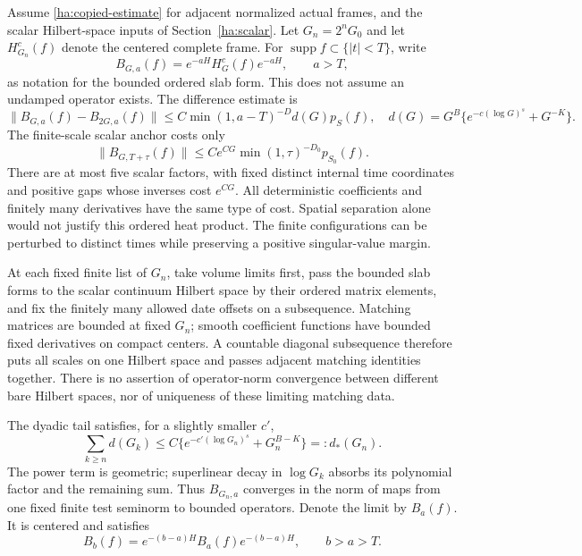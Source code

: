 Assume \eqref{ha:copied-estimate} for adjacent normalized actual frames,
and the scalar Hilbert-space inputs of Section~\ref{ha:scalar}.  Let
$G_n=2^nG_0$ and let $H_{G_n}^c(f)$ denote the centered complete frame.
For $\operatorname{supp}f\subset\{|t|<T\}$, write
\begin{equation}
 B_{G,a}(f)=e^{-aH}H_G^c(f)e^{-aH},\qquad a>T,
 \label{ha:finite-heat}
\end{equation}
as notation for the bounded ordered slab form.  This does not assume an
undamped operator exists.  The difference estimate is
\begin{equation}
 \|B_{G,a}(f)-B_{2G,a}(f)\|
 \leq C\min(1,a-T)^{-D}d(G)p_S(f),
 \quad d(G)=G^B\{e^{-c(\log G)^s}+G^{-K}\}.
 \label{ha:dyadic-difference}
\end{equation}
The finite-scale scalar anchor costs only
\begin{equation}
 \|B_{G,T+\tau}(f)\|\leq Ce^{CG}\min(1,\tau)^{-D_0}p_{S_0}(f).
 \label{ha:heat-anchor}
\end{equation}
There are at most five scalar factors, with fixed distinct internal
time coordinates and positive gaps whose inverses cost $e^{CG}$.
All deterministic coefficients and finitely many derivatives have the
same type of cost.  Spatial separation alone would not justify this
ordered heat product.  The finite configurations can be perturbed to
distinct times while preserving a positive singular-value margin.

At each fixed finite list of $G_n$, take volume limits first, pass the
bounded slab forms to the scalar continuum Hilbert space by their ordered
matrix elements, and fix the finitely many allowed date offsets on a
subsequence.  Matching matrices are bounded at fixed $G_n$; smooth
coefficient functions have bounded fixed derivatives on compact centers.
A countable diagonal subsequence therefore puts all scales on one
Hilbert space and passes adjacent matching identities together.  There
is no assertion of operator-norm convergence between different bare
Hilbert spaces, nor of uniqueness of these limiting matching data.

The dyadic tail satisfies, for a slightly smaller $c'$,
\begin{equation}
 \sum_{k\geq n}d(G_k)
 \leq C\{e^{-c'(\log G_n)^s}+G_n^{B-K}\}=:d_*(G_n).
 \label{ha:dyadic-tail}
\end{equation}
The power term is geometric; superlinear decay in $\log G_k$ absorbs
its polynomial factor and the remaining sum.  Thus $B_{G_n,a}$ converges
in the norm of maps from one fixed finite test seminorm to bounded
operators.  Denote the limit by $B_a(f)$.  It is centered and satisfies
\begin{equation}
 B_b(f)=e^{-(b-a)H}B_a(f)e^{-(b-a)H},\qquad b>a>T.
 \label{ha:heat-compatible}
\end{equation}

